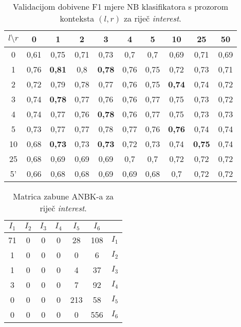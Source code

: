 \documentclass[10pt, a4paper]{article}
\begin{document}
\begin{table*}[!hbtp]
\caption{Validacijom dobivene F1 mjere NB klasifikatora s prozorom konteksta $(l,r)$ za riječ \emph{interest}.}
\label{tab:interest_validation_bayes}
\begin{center}
\begin{tabular}{|c||ccc|ccc|ccc|}
\hline
$l \setminus r$ & 0 & 1 & 2 & 3 & 4 & 5 & 10 & 25 & 50 \\
\hline\hline
0  & 0,61 & 0,75 & 0,71 & 0,73 & 0,7  & 0,7  & 0,69 & 0,71 & 0,69  \\
1  & 0,76 & \textbf{0,81} & 0,8  & \textbf{0,78} & 0,76 & 0,75 & 0,72 & 0,73 & 0,71  \\
2  & 0,72 & 0,79 & 0,78 & 0,77 & 0,76 & 0,75 & \textbf{0,74} & 0,74 & 0,72  \\\hline
3  & 0,74 & \textbf{0,78} & 0,77 & 0,76 & 0,76 & 0,77 & 0,75 & 0,73 & 0,72  \\
4  & 0,74 & 0,77 & 0,76 & \textbf{0,78} & 0,76 & 0,77 & 0,75 & 0,73 & 0,73  \\
5  & 0,73 & 0,77 & 0,77 & 0,78 & 0,77 & 0,76 & \textbf{0,76} & 0,74 & 0,74  \\\hline
10 & 0,68 & \textbf{0,73} & 0,73 & \textbf{0,73} & 0,72 & 0,73 & 0,74 & \textbf{0,75} & 0,74  \\
25 & 0,68 & 0,69 & 0,69 & 0,69 & 0,7  & 0,7  & 0,72 & 0,72 & 0,72  \\
5' & 0,66 & 0,68 & 0,68 & 0,69 & 0,69 & 0,68 & 0,7  & 0,72 & 0,72  \\
\hline
\end{tabular}
\end{center}
\end{table*}

\begin{table}[!hbtp]
\caption{Matrica zabune ANBK-a za riječ \emph{interest}.}
\label{tab:interest_confusion_bayes}
\begin{center}
\begin{tabular}{|cccccc|c|}
\hline
$I_1$ & $I_2$ & $I_3$ & $I_4$ & $I_5$ & $I_6$ &  \\
\hline
  71  & 0 &  0 &  0 & 28  & 108 &   $I_1$  \\
   1  & 0 &  0 &  0 &  0  &  6  &   $I_2$  \\
   1  & 0 &  0 &  0 &  4  & 37  &   $I_3$  \\
   3  & 0 &  0 &  0 &  7  & 92  &   $I_4$  \\
   0  & 0 &  0 &  0 & 213 & 58  &   $I_5$  \\
   0  & 0 &  0 &  0 &  0  & 556 &   $I_6$  \\
\hline
\end{tabular}
\end{center}
\end{table}
\end{document}
